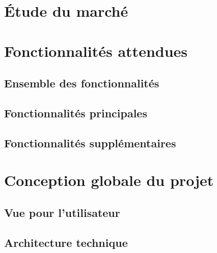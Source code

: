 \section{Étude du marché} \label{sec:etudeMarche}
\paragraph{}


\section{Fonctionnalités attendues} \label{sec:foncAttendues}
\paragraph{}

\subsection{Ensemble des fonctionnalités} \label{subsec:ensFonc}

\subsection{Fonctionnalités principales} \label{subsec:foncPrincipales}

\subsection{Fonctionnalités supplémentaires} \label{subsec:foncSupplementaires}

\section{Conception globale du projet} \label{sec:conception}
\paragraph{}

\subsection{Vue pour l’utilisateur} \label{subsec:vueUtil}

\subsection{Architecture technique} \label{subsec:archTechnique}

